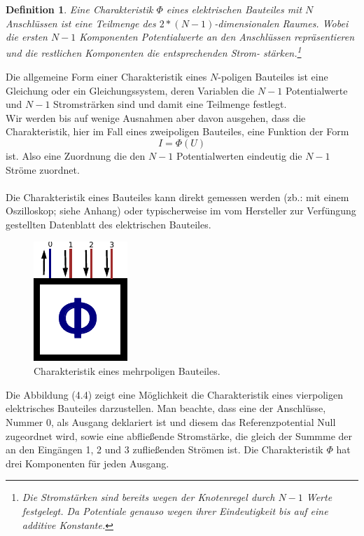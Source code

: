 \documentclass[11pt,a4paper,leqno]{report}
\newtheorem{definition}[theorem]{Definition}
\numberwithin{equation}{chapter}
\begin{document}
\begin{definition}
	Eine Charakteristik $\Phi$ eines elektrischen Bauteiles mit $N$ Anschl\"ussen ist eine Teilmenge des $2 * (N - 1)$-dimensionalen Raumes. Wobei die ersten $N - 1$ Komponenten Potentialwerte an den Anschl\"ussen repr\"asentieren und die restlichen Komponenten die entsprechenden Strom- st\"arken.\footnote{Die Stromst\"arken sind bereits wegen der Knotenregel durch $N - 1$ Werte  festgelegt. Da Potentiale genauso wegen ihrer Eindeutigkeit bis auf eine additive Konstante.}
\end{definition}
\noindent
Die allgemeine Form einer Charakteristik eines $N$-poligen Bauteiles ist eine Gleichung oder ein Gleichungssystem, deren Variablen die $N-1$ Potentialwerte und $N-1$ Stromstr\"arken sind und damit eine Teilmenge festlegt. \\Wir werden bis auf wenige Ausnahmen aber davon ausgehen, dass die Charakteristik, hier im Fall eines zweipoligen Bauteiles, eine Funktion der Form
\begin{equation*}
	I = \Phi(U)
\end{equation*}
ist. Also eine Zuordnung die den $N-1$ Potentialwerten eindeutig die $N-1$ Str\"ome zuordnet. \\
\\
Die Charakteristik eines Bauteiles kann direkt gemessen werden (zb.: mit einem Oszilloskop; siehe Anhang) oder typischerweise im vom Hersteller zur Verf\"ungung gestellten Datenblatt des elektrischen Bauteiles.
\begin{figure}[H]
	\begin{center}
		\includegraphics[scale=1]{Bilder/charakter.pdf}
	\end{center}
	\caption{Charakteristik eines mehrpoligen Bauteiles.}
\end{figure}
\noindent
Die Abbildung (4.4) zeigt eine M\"oglichkeit die Charakteristik eines vierpoligen elektrisches Bauteiles darzustellen. Man beachte, dass eine der Anschl\"usse, Nummer 0, als Ausgang deklariert ist und diesem das Referenzpotential Null zugeordnet wird, sowie eine abflie\ss{}ende Stromst\"arke, die gleich der Summme der an den Eing\"angen 1, 2 und 3 zuflie\ss{}enden Str\"omen ist. Die Charakteristik $\Phi$ hat drei Komponenten f\"ur jeden Ausgang.
\end{document}

